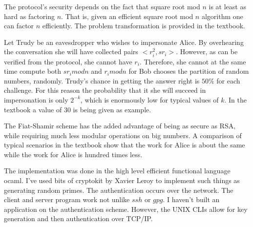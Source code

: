 \documentclass[a4paper,12pt]{article}
\begin{document}
The protocol's security depends on the fact that square root mod $n$
is at least as hard as factoring $n$. That is, given an efficient
square root mod $n$ algorithm one can factor $n$ efficiently. The
problem transformation is provided in the textbook.

Let Trudy be an eavesdropper who wishes to impersonate Alice. By
overhearing the conversation she will have collected pairs $<r_i^2,
sr_i>$. However, as can be verified from the protocol, she cannot have
$r_i$. Therefore, she cannot at the same time compute both $sr_i mod
n$ and $r_i mod n$ for Bob chooses the partition of random numbers,
randomly. Trudy's chance in getting the answer right is $50 \%$ for
each challenge. For this reason the probability that it she will
succeed in impersonation is only $2^{-k}$, which is enormously low for
typical values of $k$. In the textbook a value of $30$ is being given
as example.

The Fiat-Shamir scheme has the added advantage of being as secure as
RSA, while requiring much less modular operations on big numbers. A
comparison of typical scenarios in the textbook show that the work for
Alice is about the same while the work for Alice is hundred times
less.

The implementation was done in the high level efficient functional
language ocaml. I've used bits of cryptokit by Xavier Leroy to
implement such things as generating random primes. The authentication
occurs over the network. The client and server program work 
not unlike $ssh$ or $gpg$. I haven't built an application on the
authentication scheme. However, the UNIX CLIs allow for key generation
and then authentication over TCP/IP.
\end{document}
